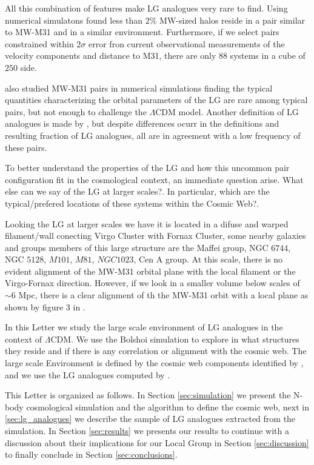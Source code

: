 \documentclass{emulateapj}
\newcommand{\lcdm}{$\Lambda$CDM }
\newcommand{\mpc}{\rm{Mpc}}
\newcommand{\hmpc}{{\ifmmode{h^{-1}{\rm Mpc}}\else{$h^{-1}$Mpc }\fi}}
\begin{document}
All this combination of features make LG analogues very rare to
find. Using numerical simulatons \citet{lganalogues} found less than
$2\%$ MW-sized halos reside in a pair similar to MW-M31 and in a
similar environment. Furthermore, if we select pairs constrained
within $2\sigma$ error fron current observational measurements of the
velocity components and distance to M31, there are only $88$ systems
in a cube of $250$ \hmpc side. 

\citet{2013ApJ...767L...5F} also studied MW-M31 pairs in numerical
simulations finding the typical quantities characterizing the orbital
parameters of the LG are rare among typical pairs, but not enough to
challenge the \lcdm model. 
Another definition of LG analogues is made by
\citet{2008MNRAS.384.1459L}, but despite differences ocurr in the
definitions and resulting fraction of LG analogues, all are in
agreement with a low frequency of these pairs. 

To better understand the properties of the LG and how this uncommon
pair configuration fit in the cosmological context, an immediate
question arise. What else can we say of the LG at larger scales?. In
particular, which are the typical/prefered locations of these systems
within the Cosmic Web?.

Looking the LG at larger scales we have it is located in a difuse and
warped filament/wall conecting Virgo Cluster with Fornax Cluster, some
nearby galaxies and groups members of this large structure are the
Maffei group, NGC $6744$, NGC $5128$, $M101$, $M81$, $NGC1023$, Cen A
group. At this scale, there is no evident alignment of the MW-M31
orbital plane with the local filament or the Virgo-Fornax
direction. However, if we look in a smaller volume below scales of
$\sim 6$ \mpc, there is a clear alignment of th the MW-M31 orbit with
a local plane as shown by figure $3$ in \citet{2013AJ....146...69C}.  

In this Letter we study the large scale environment of LG 
analogues in the context of $\Lambda$CDM. We use the Bolshoi
simulation to explore in what structures they reside and if there is
any correlation or alignment with the cosmic web. The large scale
Environment is defined by the cosmic web components identified by
\citet{Tweb}, and we use the LG analogues computed by
\citet{lganalogues}.  
   
This Letter is organized as follows. In Section \ref{sec:simulation}
we present the N-body cosmological simulation and the algorithm to
define the cosmic web, next in \ref{sec:lg_analogues} we describe the
sample of LG analogues extracted from the simulation. In
Section \ref{sec:results} we presents our results to continue with a
discussion about their implications for our Local Group in Section
\ref{sec:discussion} to finally conclude in Section
\ref{sec:conclusions}. 
\end{document}
